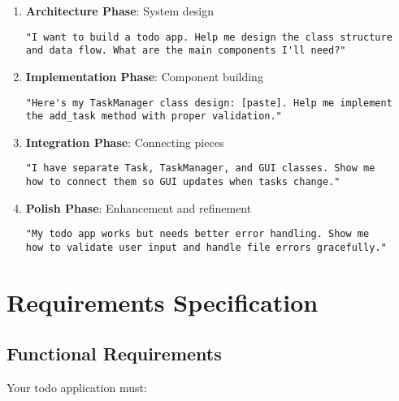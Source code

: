 \documentclass[
  letterpaper,
  DIV=11,
  numbers=noendperiod,
  oneside]{scrreprt}
\begin{document}
\begin{enumerate}
\def\labelenumi{\arabic{enumi}.}
\item
  \textbf{Architecture Phase}: System design

\begin{verbatim}
"I want to build a todo app. Help me design the class structure
and data flow. What are the main components I'll need?"
\end{verbatim}
\item
  \textbf{Implementation Phase}: Component building

\begin{verbatim}
"Here's my TaskManager class design: [paste]. Help me implement
the add_task method with proper validation."
\end{verbatim}
\item
  \textbf{Integration Phase}: Connecting pieces

\begin{verbatim}
"I have separate Task, TaskManager, and GUI classes. Show me 
how to connect them so GUI updates when tasks change."
\end{verbatim}
\item
  \textbf{Polish Phase}: Enhancement and refinement

\begin{verbatim}
"My todo app works but needs better error handling. Show me 
how to validate user input and handle file errors gracefully."
\end{verbatim}
\end{enumerate}

\section{Requirements
Specification}\label{requirements-specification-11}

\subsection{Functional Requirements}\label{functional-requirements-11}

Your todo application must:
\end{document}
